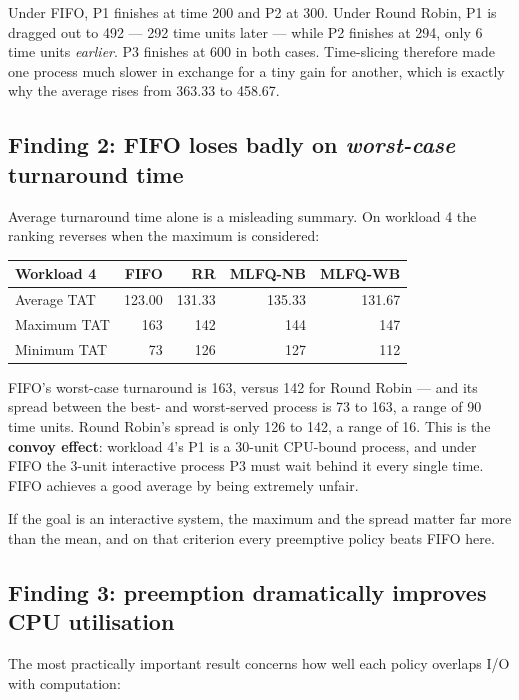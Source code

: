 \documentclass[11pt,a4paper]{article}
\begin{document}
Under FIFO, P1 finishes at time 200 and P2 at 300. Under Round Robin, P1 is dragged out to 492
--- 292 time units later --- while P2 finishes at 294, only 6 time units \emph{earlier}. P3
finishes at 600 in both cases. Time-slicing therefore made one process much slower in
exchange for a tiny gain for another, which is exactly why the average rises from 363.33 to
458.67.

\subsection{Finding 2: FIFO loses badly on \emph{worst-case} turnaround time}

Average turnaround time alone is a misleading summary. On workload 4 the ranking reverses
when the maximum is considered:

\begin{center}\small
\begin{tabular}{lrrrr}
\toprule
\textbf{Workload 4} & \textbf{FIFO} & \textbf{RR} & \textbf{MLFQ-NB} & \textbf{MLFQ-WB}\\
\midrule
Average TAT & 123.00 & 131.33 & 135.33 & 131.67 \\
Maximum TAT & 163 & 142 & 144 & 147 \\
Minimum TAT & 73 & 126 & 127 & 112 \\
\bottomrule\end{tabular}\end{center}

FIFO's worst-case turnaround is 163, versus 142 for Round Robin --- and its spread between the
best- and worst-served process is 73 to 163, a range of 90 time units. Round Robin's spread is
only 126 to 142, a range of 16. This is the \textbf{convoy effect}: workload 4's P1 is a
30-unit CPU-bound process, and under FIFO the 3-unit interactive process P3 must wait behind
it every single time. FIFO achieves a good average by being extremely unfair.

If the goal is an interactive system, the maximum and the spread matter far more than the
mean, and on that criterion every preemptive policy beats FIFO here.

\subsection{Finding 3: preemption dramatically improves CPU utilisation}

The most practically important result concerns how well each policy overlaps I/O with
computation:
\end{document}
